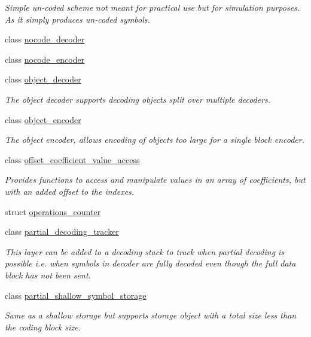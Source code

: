 \begin{DoxyCompactItemize}
\begin{DoxyCompactList}\small\item\em Simple un-\/coded scheme not meant for practical use but for simulation purposes. As it simply produces un-\/coded symbols. \end{DoxyCompactList}\item 
class \hyperlink{classkodo_1_1nocode__decoder}{nocode\-\_\-decoder}
\item 
class \hyperlink{classkodo_1_1nocode__encoder}{nocode\-\_\-encoder}
\item 
class \hyperlink{classkodo_1_1object__decoder}{object\-\_\-decoder}
\begin{DoxyCompactList}\small\item\em The object decoder supports decoding objects split over multiple decoders. \end{DoxyCompactList}\item 
class \hyperlink{classkodo_1_1object__encoder}{object\-\_\-encoder}
\begin{DoxyCompactList}\small\item\em The object encoder, allows encoding of objects too large for a single block encoder. \end{DoxyCompactList}\item 
class \hyperlink{classkodo_1_1offset__coefficient__value__access}{offset\-\_\-coefficient\-\_\-value\-\_\-access}
\begin{DoxyCompactList}\small\item\em Provides functions to access and manipulate values in an array of coefficients, but with an added offset to the indexes. \end{DoxyCompactList}\item 
struct \hyperlink{structkodo_1_1operations__counter}{operations\-\_\-counter}
\item 
class \hyperlink{classkodo_1_1partial__decoding__tracker}{partial\-\_\-decoding\-\_\-tracker}
\begin{DoxyCompactList}\small\item\em This layer can be added to a decoding stack to track when partial decoding is possible i.\-e. when symbols in decoder are fully decoded even though the full data block has not been sent. \end{DoxyCompactList}\item 
class \hyperlink{classkodo_1_1partial__shallow__symbol__storage}{partial\-\_\-shallow\-\_\-symbol\-\_\-storage}
\begin{DoxyCompactList}\small\item\em Same as a shallow storage but supports storage object with a total size less than the coding block size. \end{DoxyCompactList}\item 

\end{DoxyCompactItemize}
